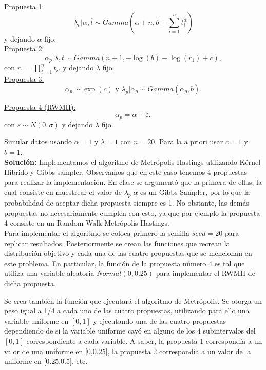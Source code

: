 \documentclass[letterpaper]{article}
\newcommand{\1}{\mathds{1}}
\theoremstyle{definition}
\theoremstyle{definition}
\theoremstyle{definition}
\theoremstyle{definition}
\theoremstyle{definition}
\begin{document}
\begin{itemize}
    \underline{Propuesta 1}:
    \[
    \lambda_p|\alpha,\overline{t}\sim Gamma \left(\alpha+n,b+\sum_{i=1}^{n}t_i^{\alpha}\right)    
    \]
    y dejando $\alpha$ fijo.\\

    \underline{Propuesta 2:}
    \[
        \alpha_p|\lambda,\overline{t}\sim Gamma(n+1,-\log(b)-\log(r_1)+c),  
    \]
    con $r_1=\prod_{i=1}^{n}t_i$. y dejando $\lambda$ fijo.\\

    \underline{Propuesta 3:} 
    \[
    \alpha_p\sim \exp(c) \text{ y } \lambda_p|\alpha_p \sim Gamma(\alpha_p,b).    
    \]

    \underline{Propuesta 4 (RWMH):}
    \[
    \alpha_p=\alpha+\varepsilon,    
    \]
    con $\varepsilon\sim N(0,\sigma)$ y dejando $\lambda$ fijo. 

    Simular datos usando $\alpha=1$ y $\lambda=1$ con $n=20$. Para la a priori usar $c=1$ y $b=1$.\\

    \textbf{Solución:} Implementamos el algoritmo de Metrópolis Hastings utilizando Kérnel Híbrido y Gibbs sampler. Observamos que 
    en este caso tenemos 4 propuestas para realizar la implementación. En clase se argumentó que la primera de ellas, la cual consiste en
    muestrear el valor de $\lambda_p|\alpha$ es un Gibbs Sampler, por lo que la probabilidad de aceptar dicha propuesta siempre es 1.
    No obstante, las demás propuestas no necesariamente cumplen con esto, ya que por ejemplo la propuesta 4 consiste en un Random Walk Metrópolis Hastings.\\

    Para implementar el algoritmo se coloca primero la semilla $seed=20$ para replicar resultados. Posteriormente se crean las funciones que recrean la distribución objetivo 
    y cada una de las cuatro propuestas que se mencionan en este problema. En particular, la función de la propuesta número 4 es tal que utiliza una variable aleatoria 
    $Normal(0,0.25)$ para implementar el RWMH de dicha propuesta. 
    \newline

    Se crea también la función que ejecutará el algoritmo de Metrópolis. Se otorga un peso igual a 1/4 a cada uno de las cuatro propuestas, utilizando para ello
    una variable uniforme en $[0,1]$ y ejecutando una de las cuatro propuestas dependiendo de si la variable uniforme cayó en alguno de los 4 subintervalos del $[0,1]$ 
    correspondiente a cada variable. A saber, la propuesta 1 correspondía a un valor de una uniforme en [0,0.25], la propuesta 2 correspondía a un 
    valor de la uniforme en [0.25,0.5], etc.
    \newline


\end{itemize}
\end{document}

